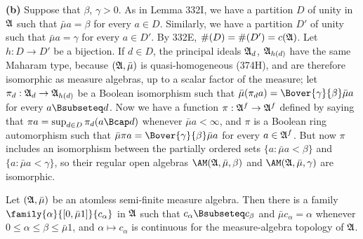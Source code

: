 {\medskip

{\bf (b)} Suppose that $\beta$, $\gamma>0$.   As in Lemma 332I, we have a
partition $D$ of unity in $\frak A$ such that $\bar\mu a=\beta$ for
every $a\in D$.   Similarly, we have a partition $D'$ of unity such that
$\bar\mu a=\gamma$ for every $a\in D'$.   By 332E,
$\#(D)=\#(D')=c(\frak A)$.   Let $h:D\to D'$ be a bijection.   If $d\in D$,
the principal ideals $\frak A_d$, $\frak A_{h(d)}$ have the same
Maharam type, because $(\frak A,\bar\mu)$ is quasi-homogeneous (374H),
and are therefore isomorphic as measure algebras, up to a
scalar factor of the measure;  let $\pi_d:\frak A_d\to\frak A_{h(d)}$ be
a Boolean isomorphism such that
$\bar\mu(\pi_da)=\Bover{\gamma}{\beta}\bar\mu a$ for every
$a\Bsubseteq d$.   Now we have a function $\pi:\frak A^f\to\frak A^f$
defined by saying that $\pi a=\sup_{d\in D}\pi_d(a\Bcap d)$ whenever
$\bar\mu a<\infty$, and $\pi$ is a Boolean ring automorphism such that
$\bar\mu\pi a=\Bover{\gamma}{\beta}\bar\mu a$ for every $a\in\frak A^f$.
But now $\pi$ includes an isomorphism between the partially ordered sets
$\{a:\bar\mu a<\beta\}$ and $\{a:\bar\mu a<\gamma\}$, so their regular
open algebras $\AM(\frak A,\bar\mu,\beta)$ and
$\AM(\frak A,\bar\mu,\gamma)$ are isomorphic.
}%

Let $(\frak A,\bar\mu)$ be an atomless semi-finite
measure algebra.   Then there is a family
$\family{\alpha}{[0,\bar\mu 1]}{c_{\alpha}}$ in $\frak A$ such that
$c_{\alpha}\Bsubseteq c_{\beta}$ and $\bar\mu c_{\alpha}=\alpha$
whenever $0\le\alpha\le\beta\le\bar\mu 1$,
and $\alpha\mapsto c_{\alpha}$ is continuous for
the measure-algebra topology of $\frak A$.



